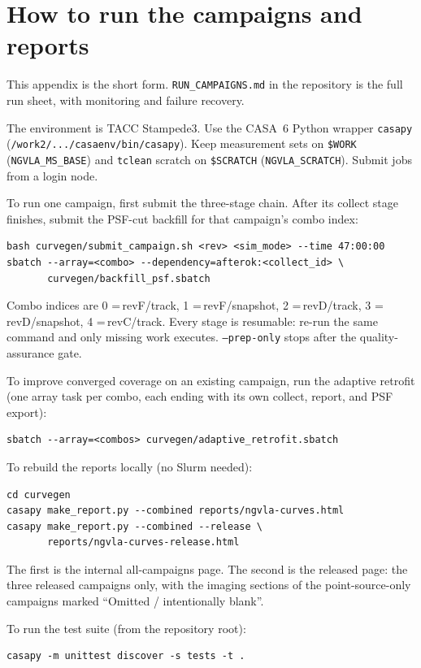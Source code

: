 \documentclass[11pt]{article}
\begin{document}
\section{How to run the campaigns and reports}
\label{sec:runbook}

This appendix is the short form.  \texttt{RUN\_CAMPAIGNS.md} in the
repository is the full run sheet, with monitoring and failure recovery.

The environment is TACC Stampede3.  Use the CASA~6 Python wrapper
\texttt{casapy}
(\texttt{/work2/.../casaenv/bin/casapy}).  Keep measurement sets on
\texttt{\$WORK} (\texttt{NGVLA\_MS\_BASE}) and \texttt{tclean} scratch on
\texttt{\$SCRATCH} (\texttt{NGVLA\_SCRATCH}).  Submit jobs from a login
node.

To run one campaign, first submit the three-stage chain.  After its collect
stage finishes, submit the PSF-cut backfill for that campaign's combo
index:
\begin{verbatim}
bash curvegen/submit_campaign.sh <rev> <sim_mode> --time 47:00:00
sbatch --array=<combo> --dependency=afterok:<collect_id> \
       curvegen/backfill_psf.sbatch
\end{verbatim}
Combo indices are 0 =\,revF/track, 1 =\,revF/snapshot, 2 =\,revD/track,
3 =\,revD/snapshot, 4 =\,revC/track.  Every stage is resumable: re-run the
same command and only missing work executes.  \texttt{--prep-only} stops
after the quality-assurance gate.

To improve converged coverage on an existing campaign, run the adaptive
retrofit (one array task per combo, each ending with its own collect,
report, and PSF export):
\begin{verbatim}
sbatch --array=<combos> curvegen/adaptive_retrofit.sbatch
\end{verbatim}

To rebuild the reports locally (no Slurm needed):
\begin{verbatim}
cd curvegen
casapy make_report.py --combined reports/ngvla-curves.html
casapy make_report.py --combined --release \
       reports/ngvla-curves-release.html
\end{verbatim}
The first is the internal all-campaigns page.  The second is the released
page: the three released campaigns only, with the imaging sections of the
point-source-only campaigns marked ``Omitted / intentionally blank''.

To run the test suite (from the repository root):
\begin{verbatim}
casapy -m unittest discover -s tests -t .
\end{verbatim}
\end{document}
